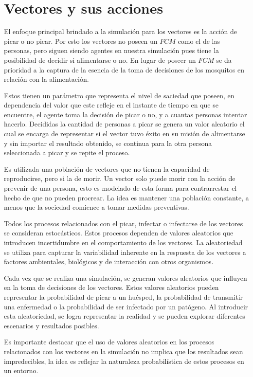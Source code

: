 \section{Vectores y sus acciones}
El enfoque principal brindado a la simulación para los vectores es la acción de picar o no picar. Por esto
los vectores no poseen un $FCM$ como el de las personas, pero siguen siendo agentes en nuestra simulación
pues tiene la posibilidad de decidir si alimentarse o no. En lugar de poseer un $FCM$ se da prioridad a la 
captura de la esencia de la toma de decisiones de los mosquitos en relación con la alimentación.

Estos tienen un parámetro que representa el nivel de saciedad que poseen, en dependencia del valor que este
refleje en el instante de tiempo en que se encuentre, el agente toma la decisión de picar o no, y a cuantas 
personas intentar hacerlo. Decididas la cantidad de personas a picar se genera un valor aleatorio el cual 
se encarga de representar si el vector tuvo éxito en su misión de alimentarse y sin importar el resultado 
obtenido, se continua para la otra persona seleccionada a picar y se repite el proceso.

Es utilizada una población de vectores que no tienen la capacidad de reproducirse, pero si la de morir. Un vector
solo puede morir con la acción de prevenir de una persona, esto es modelado de esta forma para contrarrestar
el hecho de que no pueden procrear. La idea es mantener una población constante, a menos que la sociedad
comience a tomar medidas preventivas.

Todos los procesos relacionados con el picar, infectar o infectarse de los vectores se consideran estocásticos. 
Estos procesos dependen de valores aleatorios que introducen incertidumbre en el 
comportamiento de los vectores. La aleatoriedad se utiliza para capturar la variabilidad inherente en 
la respuesta de los vectores a factores ambientales, biológicos y de interacción con otros organismos.

Cada vez que se realiza una simulación, se generan valores aleatorios que influyen en la toma de decisiones de 
los vectores. Estos valores aleatorios pueden representar la probabilidad de picar a un huésped, la 
probabilidad de transmitir una enfermedad o la probabilidad de ser infectado por un patógeno. Al introducir 
esta aleatoriedad, se logra representar la realidad y se pueden explorar diferentes escenarios 
y resultados posibles.

Es importante destacar que el uso de valores aleatorios en los procesos relacionados con los vectores en la 
simulación no implica que los resultados sean impredecibles, la idea es reflejar la 
naturaleza probabilística de estos procesos en un entorno.

